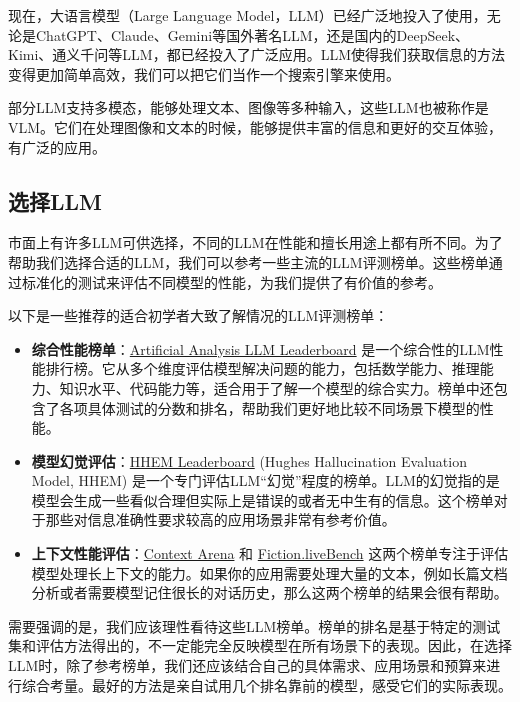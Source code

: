 \documentclass[../main.tex]{subfiles}
\begin{document}
现在，大语言模型（Large Language Model，LLM）已经广泛地投入了使用，无论是ChatGPT、Claude、Gemini等国外著名LLM，还是国内的DeepSeek、Kimi、通义千问等LLM，都已经投入了广泛应用。LLM使得我们获取信息的方法变得更加简单高效，我们可以把它们当作一个搜索引擎来使用。

部分LLM支持多模态，能够处理文本、图像等多种输入，这些LLM也被称作是VLM。它们在处理图像和文本的时候，能够提供丰富的信息和更好的交互体验，有广泛的应用。

\subsection{选择LLM}

市面上有许多LLM可供选择，不同的LLM在性能和擅长用途上都有所不同。为了帮助我们选择合适的LLM，我们可以参考一些主流的LLM评测榜单。这些榜单通过标准化的测试来评估不同模型的性能，为我们提供了有价值的参考。

以下是一些推荐的适合初学者大致了解情况的LLM评测榜单：

\begin{itemize}
  \item \textbf{综合性能榜单}：\href{https://artificialanalysis.ai/leaderboards/models}{Artificial Analysis LLM Leaderboard} 是一个综合性的LLM性能排行榜。它从多个维度评估模型解决问题的能力，包括数学能力、推理能力、知识水平、代码能力等，适合用于了解一个模型的综合实力。榜单中还包含了各项具体测试的分数和排名，帮助我们更好地比较不同场景下模型的性能。
  \item \textbf{模型幻觉评估}：\href{https://vectara-leaderboard.hf.space/}{HHEM Leaderboard} (Hughes Hallucination Evaluation Model, HHEM) 是一个专门评估LLM“幻觉”程度的榜单。LLM的幻觉指的是模型会生成一些看似合理但实际上是错误的或者无中生有的信息。这个榜单对于那些对信息准确性要求较高的应用场景非常有参考价值。
  \item \textbf{上下文性能评估}：\href{https://contextarena.ai/}{Context Arena} 和 \href{https://fiction.live/stories/Fiction-liveBench-May-22-2025/oQdzQvKHw8JyXbN87}{Fiction.liveBench} 这两个榜单专注于评估模型处理长上下文的能力。如果你的应用需要处理大量的文本，例如长篇文档分析或者需要模型记住很长的对话历史，那么这两个榜单的结果会很有帮助。
\end{itemize}

需要强调的是，我们应该理性看待这些LLM榜单。榜单的排名是基于特定的测试集和评估方法得出的，不一定能完全反映模型在所有场景下的表现。因此，在选择LLM时，除了参考榜单，我们还应该结合自己的具体需求、应用场景和预算来进行综合考量。最好的方法是亲自试用几个排名靠前的模型，感受它们的实际表现。
\end{document}
